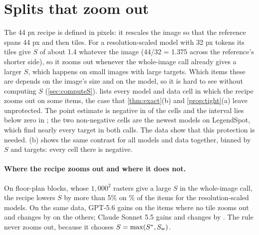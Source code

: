 \section{Splits that zoom out}
\label{sec:zoomout}

The 44 px recipe is defined in pixels: it rescales the image so that the reference spans 44 px and then tiles. For a resolution-scaled model with 32 px tokens its tiles give $S$ of about 1.4 whatever the image (44/32 = 1.375 across the reference's shorter side), so it zooms out whenever the whole-image call already gives a larger $S$, which happens on small images with large targets. Which items these are depends on the image's size and on the model, so it is hard to see without computing $S$ (\cref{sec:computeS}).  lists every model and data cell in which the recipe zooms out on some items, the case that \cref{thm:exact}(b) and \cref{prop:tight}(a) leave unprotected. The point estimate is negative in \XtcOutNegPoint{} of the \XtcOutN{} cells and the interval lies below zero in \XtcOutNeg; the two non-negative cells are the newest models on LegendSpot, which find nearly every target in both calls. The data show that this protection is needed. (b) shows the same contrast for all models and data together, binned by $S$ and targets: every cell there is negative.

\begin{table}[t]
\centering
\footnotesize
\setlength{\tabcolsep}{3pt}
\caption{Hit recall, tiles of the 44 px recipe minus the whole image, over targets interior to both, on the items where some tile has a smaller $S$ than the whole image. Bold: interval below zero. Items: drawing and class items (mosaics: items at all three areas).}
\label{tab:zoomout}
\end{table}

\paragraph{Where the recipe zooms out and where it does not.} On floor-plan blocks, whose $1{,}000^2$ rasters give a large $S$ in the whole-image call, the recipe lowers $S$ by more than 5\% on \XfSrFracDowngptFiveSix\% of the items for the resolution-scaled models. On the same data, GPT-5.6 gains \XtcIngptFiveSix{} \XtcCIIngptFiveSix{} on the items where no tile zooms out and changes by \XtcOutgptFiveSix{} \XtcCIOutgptFiveSix{} on the others; Claude Sonnet 5.5 gains \XtcInsonnetFiveFive{} \XtcCIInsonnetFiveFive{} and changes by \XtcOutsonnetFiveFive{} \XtcCIOutsonnetFiveFive. The rule never zooms out, because it chooses $S = \max(S^\ast, S_{\mathrm{w}})$.


